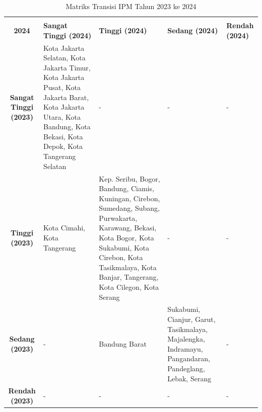 \begin{table}[H]
\centering
\caption{Matriks Transisi IPM Tahun 2023 ke 2024} \label{tab:ipm_transisi_2023_2024}
\begin{tabular}{|c|p{2cm}|p{2cm}|p{2cm}|p{2cm}|}
\hline
\makecell{\textbf{Tahun 2023} \\ \textbf{2024}} & \textbf{Sangat Tinggi (2024)} & \textbf{Tinggi (2024)} & \textbf{Sedang (2024)} & \textbf{Rendah (2024)} \\ \hline
\textbf{Sangat Tinggi (2023)} & Kota Jakarta Selatan, Kota Jakarta Timur, Kota Jakarta Pusat, Kota Jakarta Barat, Kota Jakarta Utara, Kota Bandung, Kota Bekasi, Kota Depok, Kota Tangerang Selatan & - & - & - \\ \hline
\textbf{Tinggi (2023)} & Kota Cimahi, Kota Tangerang & Kep. Seribu, Bogor, Bandung, Ciamis, Kuningan, Cirebon, Sumedang, Subang, Purwakarta, Karawang, Bekasi, Kota Bogor, Kota Sukabumi, Kota Cirebon, Kota Tasikmalaya, Kota Banjar, Tangerang, Kota Cilegon, Kota Serang & - & - \\ \hline
\textbf{Sedang (2023)} & - & Bandung Barat & Sukabumi, Cianjur, Garut, Tasikmalaya, Majalengka, Indramayu, Pangandaran, Pandeglang, Lebak, Serang & - \\ \hline
\textbf{Rendah (2023)} & - & - & - & - \\ \hline
\end{tabular}
\end{table}